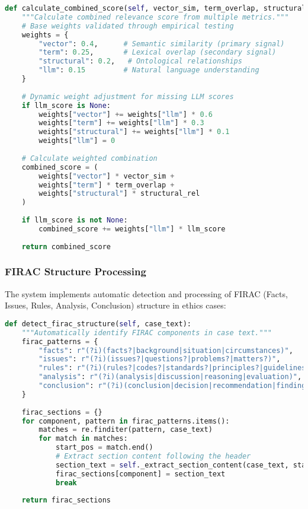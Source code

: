 \begin{lstlisting}[language=Python, caption=Multi-Metric Relevance Calculation]
def calculate_combined_score(self, vector_sim, term_overlap, structural_rel, llm_score=None):
    """Calculate combined relevance score from multiple metrics."""
    # Base weights validated through empirical testing
    weights = {
        "vector": 0.4,      # Semantic similarity (primary signal)
        "term": 0.25,       # Lexical overlap (secondary signal)
        "structural": 0.2,   # Ontological relationships
        "llm": 0.15         # Natural language understanding
    }
    
    # Dynamic weight adjustment for missing LLM scores
    if llm_score is None:
        weights["vector"] += weights["llm"] * 0.6
        weights["term"] += weights["llm"] * 0.3
        weights["structural"] += weights["llm"] * 0.1
        weights["llm"] = 0
    
    # Calculate weighted combination
    combined_score = (
        weights["vector"] * vector_sim +
        weights["term"] * term_overlap +
        weights["structural"] * structural_rel
    )
    
    if llm_score is not None:
        combined_score += weights["llm"] * llm_score
    
    return combined_score
\end{lstlisting}

\subsubsection{FIRAC Structure Processing}

The system implements automatic detection and processing of FIRAC (Facts, Issues, Rules, Analysis, Conclusion) structure in ethics cases:

\begin{lstlisting}[language=Python, caption=FIRAC Structure Detection]
def detect_firac_structure(self, case_text):
    """Automatically identify FIRAC components in case text."""
    firac_patterns = {
        "facts": r"(?i)(facts?|background|situation|circumstances)",
        "issues": r"(?i)(issues?|questions?|problems?|matters?)",
        "rules": r"(?i)(rules?|codes?|standards?|principles?|guidelines?)",
        "analysis": r"(?i)(analysis|discussion|reasoning|evaluation)",
        "conclusion": r"(?i)(conclusion|decision|recommendation|finding)"
    }
    
    firac_sections = {}
    for component, pattern in firac_patterns.items():
        matches = re.finditer(pattern, case_text)
        for match in matches:
            start_pos = match.end()
            # Extract section content following the header
            section_text = self._extract_section_content(case_text, start_pos, component)
            firac_sections[component] = section_text
            break
    
    return firac_sections
\end{lstlisting}

